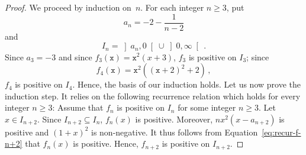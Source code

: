 \documentclass[12pt]{article}
\newcommand{\ttx}{\mathtt{x}}
\newtheorem{theorem}{Theorem}
\begin{document}
 \begin{proof}
   We proceed by induction on~$n$.
   For each integer $n \ge 3$, put
   $$
   a_n = - 2 - \frac{1}{n - 2} 
   $$
   and
   $$
   I_n = \left] a_n, 0 \right[ \cup \left]0, \infty \right[ \, .
   $$
   Since $a_3 = - 3$ and since $f_3(\ttx) = \ttx^2 (x + 3)$,
   $f_3$ is positive on $I_3$;
   since
   $$
   f_4(\ttx) = \ttx^2 ({(\ttx + 2)}^2 + 2 ) \,, 
   $$
   $f_4$ is positive on $I_4$. 
   Hence, the basis of our induction holds.
   Let us now prove the induction step.
   It  relies on the following recurrence relation which holds for every integer $n \ge 3$:
   Assume that $f_n$ is positive on $I_n$ for some integer $n \ge 3$.
   Let $x \in I_{n + 2}$.
   Since $I_{n + 2} \subseteq I_n$,
   $f_n(x)$ is positive.
   Moreover, 
   $n x^2(x - a_{n + 2})$ is positive and ${(1 + x)}^2$ is non-negative.
   It thus follows from Equation~\eqref{eq:recur-f-n+2} that $f_n(x)$ is positive.
   Hence, $f_{n + 2}$ is positive on $I_{n + 2}$.
  \end{proof} 
 
    
  


 
\end{document}
